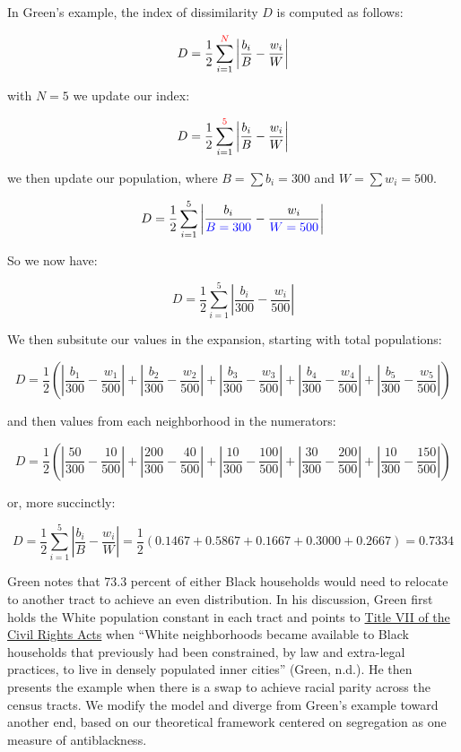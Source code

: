 \documentclass[
  letterpaper,
  DIV=11,
  numbers=noendperiod]{scrartcl}
\begin{document}
In Green's example, the index of dissimilarity \(D\) is computed as
follows:

\[
D = \frac{1}{2} \sum_{i=1}^{\textcolor{red}{N}}  \left| \frac{b_i}{B} - \frac{w_i}{W} \right|
\]

with \(N=5\) we update our index:

\[
D = \frac{1}{2} \sum_{i=1}^{\textcolor{red}{5}} \left| \frac{b_i}{B} - \frac{w_i}{W} \right|
\]

we then update our population, where \(B = \sum b_i = 300\) and
\(W = \sum w_i = 500\).

\[
D = \frac{1}{2} \sum_{i=1}^{5} \left| \frac{b_i}{\textcolor{blue}{B = 300}} - \frac{w_i}{\textcolor{blue}{W = 500}} \right|
\]

So we now have:

\[
D = \frac{1}{2} \sum_{i=1}^5 \left| \frac{b_i}{300} - \frac{w_i}{500} \right| 
\]

We then subsitute our values in the expansion, starting with total
populations:

\[
D = \frac{1}{2} \left( 
\left| \frac{b_1}{300} - \frac{w_1}{500} \right| +
\left| \frac{b_2}{300} - \frac{w_2}{500} \right| +
\left| \frac{b_3}{300} - \frac{w_3}{500} \right| +
\left| \frac{b_4}{300} - \frac{w_4}{500} \right| +
\left| \frac{b_5}{300} - \frac{w_5}{500} \right|
\right )
\]

and then values from each neighborhood in the numerators:

\[
D = \frac{1}{2} \left(
\left| \frac{50}{300} - \frac{10}{500} \right| +
\left| \frac{200}{300} - \frac{40}{500} \right| +
\left| \frac{10}{300} - \frac{100}{500} \right| +
\left| \frac{30}{300} - \frac{200}{500} \right| +
\left| \frac{10}{300} - \frac{150}{500} \right|
\right)
\]

or, more succinctly:

\[
D = \frac{1}{2} \sum_{i=1}^5 \left| \frac{b_i}{B} - \frac{w_i}{W} \right| = \frac{1}{2} (0.1467 + 0.5867 + 0.1667 + 0.3000 + 0.2667) = 0.7334
\]

Green notes that 73.3 percent of either Black households would need to
relocate to another tract to achieve an even distribution. In his
discussion, Green first holds the White population constant in each
tract and points to
\href{https://www.eeoc.gov/statutes/title-vii-civil-rights-act-1964}{Title
VII of the Civil Rights Acts} when ``White neighborhoods became
available to Black households that previously had been constrained, by
law and extra-legal practices, to live in densely populated inner
cities'' (Green, n.d.). He then presents the example when there is a
swap to achieve racial parity across the census tracts. We modify the
model and diverge from Green's example toward another end, based on our
theoretical framework centered on segregation as one measure of
antiblackness.
\end{document}
